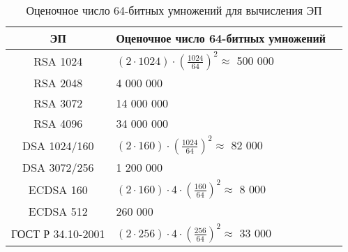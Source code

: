 \begin{table}[!ht]
    \centering
    \caption{Оценочное число 64-битных умножений для вычисления ЭП\label{tab:signature-rate}}
    \begin{tabular}{|c|l|c|}
        \hline
        ЭП & Оценочное число 64-битных умножений \\
        \hline \hline
        RSA\index{криптосистема!RSA} 1024 & $(2 \cdot 1024) \cdot \left( \frac{1024}{64} \right)^2 \approx$ 500 000 \\
        RSA\index{криптосистема!RSA} 2048 & 4 000 000 \\
        RSA\index{криптосистема!RSA} 3072 & 14 000 000 \\
        RSA\index{криптосистема!RSA} 4096 & 34 000 000 \\
        \hline \hline
        DSA 1024/160 & $(2 \cdot 160) \cdot \left( \frac{1024}{64} \right)^2 \approx$ 82 000 \\
        DSA 3072/256 & 1 200 000 \\
        \hline \hline
        ECDSA 160 & $(2 \cdot 160) \cdot 4 \cdot \left( \frac{160}{64} \right)^2 \approx$ 8 000 \\
        ECDSA 512 & 260 000 \\
        \hline \hline
        ГОСТ Р 34.10-2001 & $(2 \cdot 256) \cdot 4 \cdot \left( \frac{256}{64} \right)^2 \approx$ 33 000 \\
        \hline
    \end{tabular}
\end{table}
